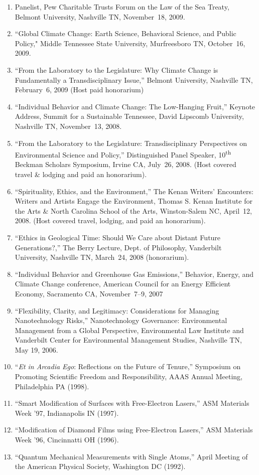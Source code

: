 \begin{enumerate}
\item Panelist, Pew Charitable Trusts Forum on the Law of the Sea Treaty, Belmont University, Nashville TN, November~18, 2009.
\item ``Global Climate Change: Earth Science, Behavioral Science, and Public Policy," Middle Tennessee State University, Murfreesboro TN, October~16, 2009.
\item ``From the Laboratory to the Legislature: Why Climate Change is Fundamentally a Transdisciplinary Issue,'' Belmont University, Nashville TN, February~6, 2009 (Host paid honorarium)
\item ``Individual Behavior and Climate Change: The Low-Hanging Fruit,'' Keynote Address, Summit for a Sustainable Tennessee, David Lipscomb University, Nashville TN, November~13, 2008.
\item ``From the Laboratory to the Legislature: Transdisciplinary Perspectives on Environmental Science and Policy,'' Distinguished Panel Speaker, 10\textsuperscript{th} Beckman Scholars Symposium, Irvine CA, July~26, 2008. (Host covered travel \& lodging and paid an honorarium).
\item ``Spirituality, Ethics, and the Environment,'' The Kenan Writers' Encounters: Writers and Artists Engage the Environment, Thomas S. Kenan Institute for the Arts \& North Carolina School of the Arts, Winston-Salem NC, April~12, 2008. (Host covered travel, lodging, and paid an honorarium).
\item ``Ethics in Geological Time: Should We Care about Distant Future Generations?,'' The Berry Lecture, Dept. of Philosophy, Vanderbilt University, Nashville TN, March~24, 2008 (honorarium).
\item ``Individual Behavior and Greenhouse Gas Emissions,'' Behavior, Energy, and Climate Change conference, American Council for an Energy Efficient Economy, Sacramento CA, November~7--9, 2007
\item ``Flexibility, Clarity, and Legitimacy: Considerations for Managing Nanotechnology Risks,'' Nanotechnology Governance: Environmental Management from a Global Perspective, Environmental Law Institute and Vanderbilt Center for Environmental Management Studies, Nashville TN, May 19, 2006.
\item ``\emph{Et in Arcadia Ego}: Reflections on the Future of Tenure,'' Symposium on Promoting Scientific Freedom and Responsibility, AAAS Annual Meeting, Philadelphia PA (1998).
\item ``Smart Modification of Surfaces with Free-Electron Lasers,'' ASM Materials Week '97, Indianapolis IN (1997).
\item ``Modification of Diamond Films using Free-Electron Lasers,'' ASM Materials Week '96, Cincinnatti OH (1996).
\item ``Quantum Mechanical Measurements with Single Atoms,'' April Meeting of the American Physical Society, Washington DC (1992).
\end{enumerate}
